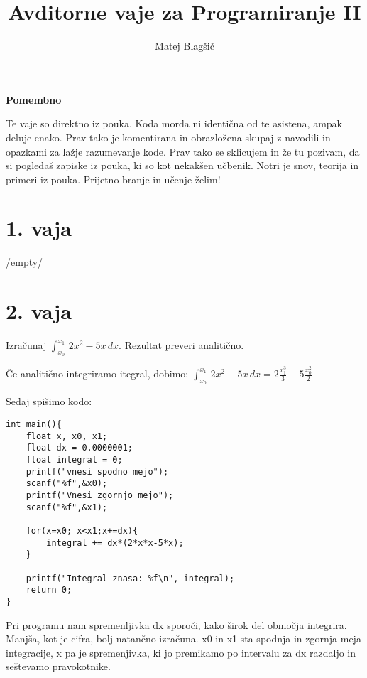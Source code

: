 \documentclass[a4paper, 12pt]{article}
\title{Avditorne vaje za Programiranje II}
\author{Matej Blagšič}
\begin{document}

	\maketitle
	\thispagestyle{empty}
	\pagebreak
	\setcounter{page}{1}

\begin{center}
\textbf{Pomembno}
\end{center}
Te vaje so direktno iz pouka. Koda morda ni identična od te asistena, ampak deluje enako. Prav tako je komentirana in obrazložena skupaj z navodili in opazkami za lažje razumevanje kode. Prav tako se sklicujem in že tu pozivam, da si pogledaš zapiske iz pouka, ki so kot nekakšen učbenik. Notri je snov, teorija in primeri iz pouka. Prijetno branje in učenje želim!

\section*{1. vaja}
/empty/
\section*{2. vaja}

\underline{Izračunaj $\int_{x_0}^{x_1}\, 2x^2-5x\, dx$. Rezultat preveri analitično.}	\

Če analitično integriramo itegral, dobimo: $\int_{x_0}^{x_1}\, 2x^2-5x\, dx = 2\frac{x_1^3}3-5\frac{x_0^2}2$\

Sedaj spišimo kodo:
\begin{lstlisting}
int main(){
	float x, x0, x1;
	float dx = 0.0000001;
	float integral = 0;
	printf("vnesi spodno mejo");
	scanf("%f",&x0);
	printf("Vnesi zgornjo mejo");
	scanf("%f",&x1);

	for(x=x0; x<x1;x+=dx){
		integral += dx*(2*x*x-5*x);
	}

	printf("Integral znasa: %f\n", integral);
	return 0;
}
\end{lstlisting}
Pri programu nam spremenljivka dx sporoči, kako širok del območja integrira. Manjša, kot je cifra, bolj natančno izračuna. x0 in x1 sta spodnja in zgornja meja integracije, x pa je spremenjivka, ki jo premikamo po intervalu za dx razdaljo in seštevamo pravokotnike.
	
\end{document}
